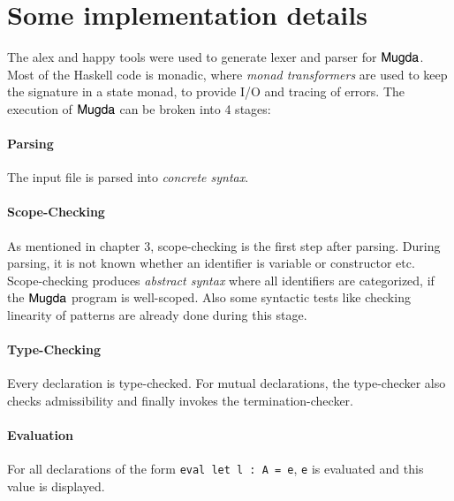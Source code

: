 \section{Some implementation details}
The alex \cite{alex} and happy \cite{happy} tools were used to generate lexer and parser for $\textsf{Mugda}$.
Most of the Haskell code is monadic, where \emph{monad transformers} \cite{Grabmueller2006MonadTransformers} are used to keep the signature in a state monad, to provide I/O and tracing of errors. The execution of $\textsf{Mugda}$ can be broken into 4 stages:
\paragraph*{Parsing}
The input file is parsed into \emph{concrete syntax}.
\paragraph*{Scope-Checking}
As mentioned in chapter 3, scope-checking is the first step after parsing.
During parsing, it is not known whether an identifier is variable or constructor etc.
Scope-checking produces \emph{abstract syntax} where all identifiers are categorized, if the $\textsf{Mugda}$ program is well-scoped.
Also some syntactic tests like checking linearity of patterns are already done during this stage.
\paragraph*{Type-Checking}
Every declaration is type-checked.
For mutual declarations, the type-checker also checks admissibility and finally invokes the termination-checker. 
\paragraph*{Evaluation}
For all declarations of the form \verb+eval let l : A = e+, \verb+e+ is evaluated and this value is displayed.